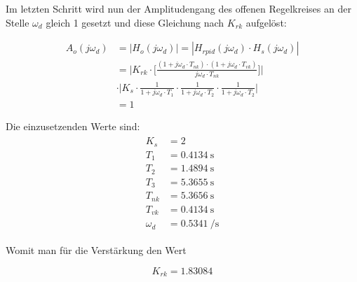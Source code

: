 Im letzten  Schritt wird  nun der Amplitudengang  des offenen  Regelkreises an
der  Stelle $\omega_d$  gleich 1  gesetzt  und diese  Gleichung nach  $K_{rk}$
aufgel\"ost:

\begin{equation} \label{eq:pid:h_o_k_rk_one}
    \begin{split}
        A_{o}(j\omega_d)    & = | H_{o}(j\omega_d) | = | H_{rpid}(j\omega_d) \cdot H_s(j\omega_d) |    \\
                            & = \Biggl \rvert
                                    K_{rk}
                                    \cdot
                                    \biggl[ \frac{(1 + j\omega_d \cdot T_{nk}) \cdot (1 + j\omega_d \cdot T_{vk}) }{ j\omega_d \cdot T_{nk} } \biggr] \Biggr \rvert \\
                            & \cdot
                                \Biggl \rvert
                                    K_s
                                    \cdot \frac{1}{1 + j\omega_d \cdot T_1}
                                    \cdot \frac{1}{1 + j\omega_d \cdot T_2}
                                    \cdot \frac{1}{1 + j\omega_d \cdot T_2}
                                    \Biggr \rvert \\
                            & = 1
    \end{split}
\end{equation}

Die einzusetzenden Werte sind:
\begin{gather} \label{eq:pid:h_o_k_rk_one}
    \begin{split}
        K_s         & = 2                        \\
        T_1         & = \SI{0.4134}{\second}     \\
        T_2         & = \SI{1.4894}{\second}     \\
        T_3         & = \SI{5.3655}{\second}     \\
        T_{nk}      & = \SI{5.3656}{\second}     \\
        T_{vk}      & = \SI{0.4134}{\second}     \\
        \omega_d    & = \SI{0.5341}{\per\second}
    \end{split}
\end{gather}

Womit man f\"ur die Verst\"arkung den Wert

\begin{equation} \label{eq:pid:k_rk_result}
    K_{rk} = 1.83084
\end{equation}

